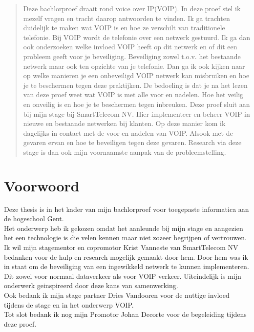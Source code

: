 \documentclass[pdftex,a4paper,12pt,twoside]{report}
\begin{document}
\begin{abstract}

Deze bachlorproef draait rond voice over IP(VOIP). In deze proef stel ik mezelf vragen en tracht daarop antwoorden te vinden. Ik ga trachten duidelijk te maken wat VOIP is en hoe ze verschilt van traditionele telefonie. Bij VOIP wordt de telefonie over een netwerk gestuurd. Ik ga dan ook onderzoeken welke invloed VOIP heeft op dit netwerk en of dit een probleem geeft voor je beveiliging. Beveiliging zowel t.o.v. het bestaande netwerk maar ook ten opzichte van je telefonie. Dan ga ik ook kijken naar op welke manieren je een onbeveiligd VOIP netwerk kan misbruiken en hoe je te beschermen tegen deze praktijken. De bedoeling is dat je na het lezen van deze proef weet wat VOIP is met alle voor en nadelen. Hoe het veilig en onveilig is en hoe je te beschermen tegen inbreuken. Deze proef sluit aan bij mijn stage bij SmartTelecom NV. Hier implementeer en beheer VOIP in nieuwe en bestaande netwerken bij klanten. Op deze manier kom ik dagelijks in contact met de voor en nadelen van VOIP. Alsook met de gevaren ervan en hoe te beveiligen tegen deze gevaren. Research via deze stage is dan ook mijn voornaamste aanpak van de probleemstelling.
 
\end{abstract}

\chapter*{Voorwoord}
\label{ch:voorwoord}
Deze thesis is in het kader van mijn bachlorproef voor toegepaste informatica aan de hogeschool Gent.\\
Het onderwerp heb ik gekozen omdat het aanleunde bij mijn stage en aangezien het een technologie is die velen kennen maar niet zozeer begrijpen of vertrouwen. 
Ik wil mijn stagementor en copromotor Krist Vanneste van SmartTelecom NV bedanken voor de hulp en research mogelijk gemaakt door hem. Door hem was ik in staat om de beveiliging van een ingewikkeld netwerk te kunnen implementeren. Dit zowel voor normaal dataverkeer als voor VOIP verkeer. Uiteindelijk is mijn onderwerk geinspireerd door deze kans van samenwerking.\\
Ook bedank ik mijn stage partner Dries Vandooren voor de nuttige invloed tijdens de stage en in het onderwerp VOIP.\\
Tot slot bedank ik nog mijn Promotor Johan Decorte voor de begeleiding tijdens deze proef.
\end{document}
